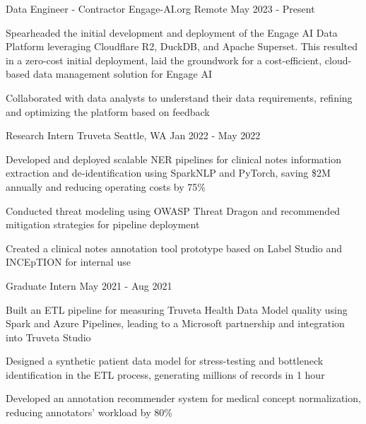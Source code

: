 \vspace{-4mm}
\vspace{-2mm}

\begin{cventries}
	\cventry
	{Data Engineer - Contractor}
	{Engage-AI.org}
	{Remote}
	{May 2023 - Present}
	{\begin{cvitems}
			\item {Spearheaded the initial development and deployment of the Engage AI Data Platform leveraging Cloudflare R2, DuckDB, and Apache Superset. This resulted in a zero-cost initial deployment, laid the groundwork for a cost-efficient, cloud-based data management solution for Engage AI}
			\item {Collaborated with data analysts to understand their data requirements, refining and optimizing the platform based on feedback}
		\end{cvitems}}
	\vspace{-1mm}

	\cventry
	{Research Intern}
	{Truveta}
	{Seattle, WA}
	{Jan 2022 - May 2022}
	{\begin{cvitems}
			\item {Developed and deployed scalable NER pipelines for clinical notes information extraction and de‑identification using SparkNLP and PyTorch, saving \$2M annually and reducing operating costs by 75\%}
			\item {Conducted threat modeling using OWASP Threat Dragon and recommended mitigation strategies for pipeline deployment}
			\item {Created a clinical notes annotation tool prototype based on Label Studio and INCEpTION for internal use}
		\end{cvitems}}
	\vspace{1mm}
	\cventry
	{Graduate Intern}
	{}
	{}
	{May 2021 - Aug 2021}
	{\begin{cvitems}
			\item {Built an ETL pipeline for measuring Truveta Health Data Model quality using Spark and Azure Pipelines, leading to a Microsoft partnership and integration into Truveta Studio}
			\item {Designed a synthetic patient data model for stress-testing and bottleneck identification in the ETL process, generating millions of records in 1 hour}
			\item {Developed an annotation recommender system for medical concept normalization, reducing annotators' workload by 80\%}
		\end{cvitems}}


\end{cventries}
